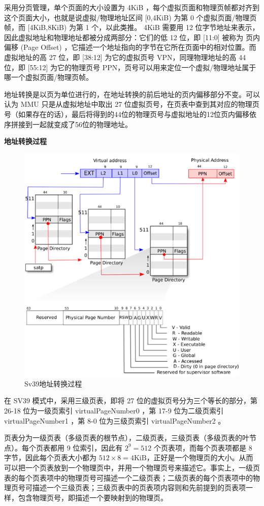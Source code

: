 采用分页管理，单个页面的大小设置为 4KiB ，每个虚拟页面和物理页帧都对齐到这个页面大小，也就是说虚拟/物理地址区间 [0,4KiB) 为第 0 个虚拟页面/物理页帧，而 [4KiB,8KiB) 为第 1 个，以此类推。 4KiB 需要用 12 位字节地址来表示，因此虚拟地址和物理地址都被分成两部分：它们的低 12 位，即 [11:0] 被称为 页内偏移 (Page Offset) ，它描述一个地址指向的字节在它所在页面中的相对位置。而虚拟地址的高 27 位，即 [38:12] 为它的虚拟页号 VPN，同理物理地址的高 44 位，即 [55:12] 为它的物理页号 PPN，页号可以用来定位一个虚拟/物理地址属于哪一个虚拟页面/物理页帧。

地址转换是以页为单位进行的，在地址转换的前后地址的页内偏移部分不变。可以认为 MMU 只是从虚拟地址中取出 27 位虚拟页号，在页表中查到其对应的物理页号（如果存在的话），最后将得到的44位的物理页号与虚拟地址的12位页内偏移依序拼接到一起就变成了56位的物理地址。


\textbf{地址转换过程}

\begin{figure}[htb]
    \figureCapSet
    \centering
    \includegraphics[width=.8\linewidth]{figure/c2/addressv2p.png}
    \caption{Sv39地址转换过程}
    \label{figure:c2addressv2p}
\end{figure}

在 SV39 模式中，采用三级页表，即将 27 位的虚拟页号分为三个等长的部分，第 26-18 位为一级页索引 virtualPageNumber0 ，第 17-9 位为二级页索引 virtualPageNumber1 ，第 8-0 位为三级页索引 virtualPageNumber2 。

页表分为一级页表（多级页表的根节点），二级页表，三级页表（多级页表的叶节点）。每个页表都用 9 位索引，因此有 $2^9=512$ 个页表项，而每个页表项都是 8 字节，因此每个页表大小都为 $512\times 8=4 \mathrm{KiB}$，正好是一个物理页的大小。从而可以把一个页表放到一个物理页中，并用一个物理页号来描述它。事实上，一级页表的每个页表项中的物理页号可描述一个二级页表；二级页表的每个页表项中的物理页号可描述一个三级页表；三级页表中的页表项内容则和先前提到的页表项一样，包含物理页号，即描述一个要映射到的物理页。


